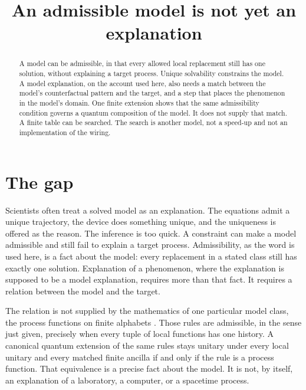 \documentclass[12pt]{article}
\title{An admissible model is not yet an explanation}
\author{}
\date{}
\begin{document}
\maketitle
\begin{abstract}
A model can be admissible, in that every allowed local replacement still has one solution, without explaining a target process. Unique solvability constrains the model. A model explanation, on the account used here, also needs a match between the model's counterfactual pattern and the target, and a step that places the phenomenon in the model's domain. One finite extension shows that the same admissibility condition governs a quantum composition of the model. It does not supply that match. A finite table can be searched. The search is another model, not a speed-up and not an implementation of the wiring.
\end{abstract}

\section{The gap}
\label{sec:gap}

Scientists often treat a solved model as an explanation. The equations admit a unique trajectory, the device does something unique, and the uniqueness is offered as the reason. The inference is too quick. A constraint can make a model admissible and still fail to explain a target process. Admissibility, as the word is used here, is a fact about the model: every replacement in a stated class still has exactly one solution. Explanation of a phenomenon, where the explanation is supposed to be a model explanation, requires more than that fact. It requires a relation between the model and the target.

The relation is not supplied by the mathematics of one particular model class, the process functions on finite alphabets \citep{baumeler2016}. Those rules are admissible, in the sense just given, precisely when every tuple of local functions has one history. A canonical quantum extension of the same rules stays unitary under every local unitary and every matched finite ancilla if and only if the rule is a process function. That equivalence is a precise fact about the model. It is not, by itself, an explanation of a laboratory, a computer, or a spacetime process.
\end{document}
